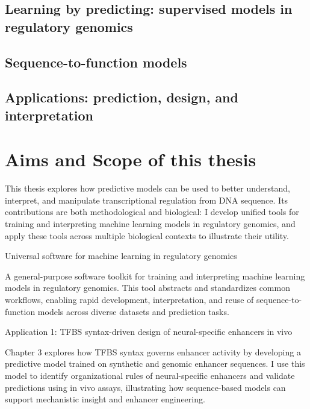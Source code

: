 \begin{dissertationintroduction}
    \subsection{Learning by predicting: supervised models in regulatory genomics}

    \subsection{Sequence-to-function models}

    \subsection{Applications: prediction, design, and interpretation}

    \section{Aims and Scope of this thesis}

    This thesis explores how predictive models can be used to better understand, interpret, and manipulate transcriptional regulation from DNA sequence. Its contributions are both methodological and biological: I develop unified tools for training and interpreting machine learning models in regulatory genomics, and apply these tools across multiple biological contexts to illustrate their utility.

    Universal software for machine learning in regulatory genomics

    A general-purpose software toolkit for training and interpreting machine learning models in regulatory genomics. This tool abstracts and standardizes common workflows, enabling rapid development, interpretation, and reuse of sequence-to-function models across diverse datasets and prediction tasks.

    Application 1: TFBS syntax-driven design of neural-specific enhancers in vivo

    Chapter 3 explores how TFBS syntax governs enhancer activity by developing a predictive model trained on synthetic and genomic enhancer sequences. I use this model to identify organizational rules of neural-specific enhancers and validate predictions using in vivo assays, illustrating how sequence-based models can support mechanistic insight and enhancer engineering.


\end{dissertationintroduction}
